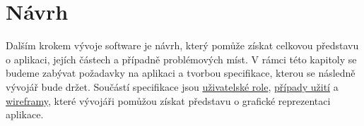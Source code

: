 \chapter{Návrh}
\label{ch:design}
Dalším krokem vývoje software je návrh, který pomůže získat celkovou představu o aplikaci, jejích částech a případně problémových míst. V rámci této kapitoly se budeme zabývat požadavky na aplikaci a tvorbou specifikace, kterou se následně vývojář bude držet. Součástí specifikace jsou \hyperref[sc:user_roles]{uživatelské role}, \hyperref[sc:use_cases]{případy užití} a \hyperref[sc:wireframes]{wireframy}, které vývojáři pomůžou získat představu o grafické reprezentaci aplikace.











